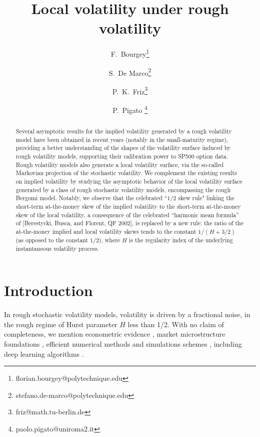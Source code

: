 \documentclass[11pt]{article}
\theoremstyle{plain}
\theoremstyle{definition}
\theoremstyle{remark}
\newcommand{\1}{\mathbf{1}}
\numberwithin{equation}{section}
\begin{document}
\title{\textbf{Local volatility under rough volatility}}


\author[1,2]{
	F.\ Bourgey\thanks{florian.bourgey@polytechnique.edu}}
\author[1]{
	S.\ De Marco\thanks{stefano.de-marco@polytechnique.edu}}
\author[3]{
	P.\ K.\ Friz\thanks{friz@math.tu-berlin.de}}
\author[4]{
	P.\ Pigato \thanks{paolo.pigato@uniroma2.it}}

\maketitle

\begin{abstract}
\noindent Several asymptotic results for the implied volatility generated by a rough volatility model have been obtained in recent years
(notably in the small-maturity regime), providing a better understanding of the shapes of the volatility surface induced by rough volatility models,
supporting their calibration power to SP500 option data.
Rough volatility models also generate a local volatility surface, via the so-called Markovian projection of the stochastic volatility.
We complement the existing results on implied volatility by studying
the asymptotic behavior of the local volatility surface generated by a class of rough stochastic volatility models, encompassing the rough Bergomi model.
Notably, we observe that the celebrated ``$1/2$ skew rule" linking the short-term at-the-money skew of the implied volatility to the 
short-term at-the-money skew of the local volatility, a consequence of the celebrated ``harmonic mean formula''
of [Berestycki, Busca, and Florent, QF 2002], 
is replaced by a new rule: the ratio of the at-the-money implied and local volatility
skews tends to the constant $1/(H + 3/2)$ (as opposed to
the constant $1/2$), where $H$ is the regularity index of the underlying instantaneous volatility process.
\end{abstract}


\section{Introduction}\label{sec:intro}
In rough stochastic volatility models, volatility is driven by a fractional noise, in the rough regime of Hurst parameter $H$ less than 1/2. With no claim of completeness, we mention econometric evidence \cite{gatheral2018volatility,FTW19,BLP16},  market microstructure foundations \cite{el2018microstructural}, efficient numerical methods and simulations schemes \cite{bayer2020,BLP15,McCrickerdPakkanen2018,euch2016characteristic}, including deep learning algorithms \cite{bayer2019deep, goudenege}.
\end{document}
